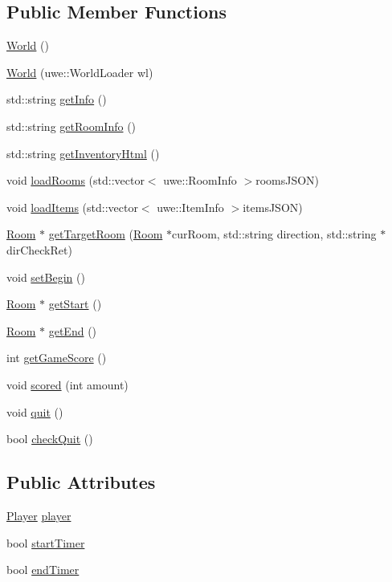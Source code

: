 \subsection*{Public Member Functions}
\begin{DoxyCompactItemize}
\item 
\hyperlink{class_world_afa39d4e6f714a7a3691ac0c656f5e8a8}{World} ()
\item 
\hyperlink{class_world_aa95deade27bae5842d7faf397e675e30}{World} (uwe\+::\+World\+Loader wl)
\item 
std\+::string \hyperlink{class_world_a35c3f1ee9e59671afd8afe7153080c60}{get\+Info} ()
\item 
std\+::string \hyperlink{class_world_aa45cb41c5134a61443d9e1d8af6638ca}{get\+Room\+Info} ()
\item 
std\+::string \hyperlink{class_world_ae5944d2cac3bb7d2b9ba011b8d159f1d}{get\+Inventory\+Html} ()
\item 
void \hyperlink{class_world_a89353bcb222a0ebc6426916279ac3885}{load\+Rooms} (std\+::vector$<$ uwe\+::\+Room\+Info $>$rooms\+J\+S\+ON)
\item 
void \hyperlink{class_world_a9c7027f0e1a55071bba3193055929f03}{load\+Items} (std\+::vector$<$ uwe\+::\+Item\+Info $>$items\+J\+S\+ON)
\item 
\hyperlink{class_room}{Room} $\ast$ \hyperlink{class_world_a2ec491313aa804a0cc85f240c0a06a39}{get\+Target\+Room} (\hyperlink{class_room}{Room} $\ast$cur\+Room, std\+::string direction, std\+::string $\ast$dir\+Check\+Ret)
\item 
void \hyperlink{class_world_ab8297b76c6b6b91b51b327ee11fe6d5c}{set\+Begin} ()
\item 
\hyperlink{class_room}{Room} $\ast$ \hyperlink{class_world_a84b3872e280eb4f6761a4b1eb0a41e69}{get\+Start} ()
\item 
\hyperlink{class_room}{Room} $\ast$ \hyperlink{class_world_aaea5355cb0778dd10fc079f579c6a60c}{get\+End} ()
\item 
int \hyperlink{class_world_a7eff312b873974bc1fba0fc733e406d7}{get\+Game\+Score} ()
\item 
void \hyperlink{class_world_a59b27842de8fa5982a6deb8333f152d6}{scored} (int amount)
\item 
void \hyperlink{class_world_ac89bad423d24334fa8d9d539a18707ff}{quit} ()
\item 
bool \hyperlink{class_world_a4f052f529eb1af58eeb38d717270b9d7}{check\+Quit} ()
\end{DoxyCompactItemize}
\subsection*{Public Attributes}
\begin{DoxyCompactItemize}
\item 
\hyperlink{class_player}{Player} \hyperlink{class_world_af12585403cef12e595e282dd27948d9a}{player}
\item 
bool \hyperlink{class_world_a7270b9f8836a03add50bffdf20d9d199}{start\+Timer}
\item 
bool \hyperlink{class_world_a16e241b63b668a74380b4db331a4e9ea}{end\+Timer}
\end{DoxyCompactItemize}
